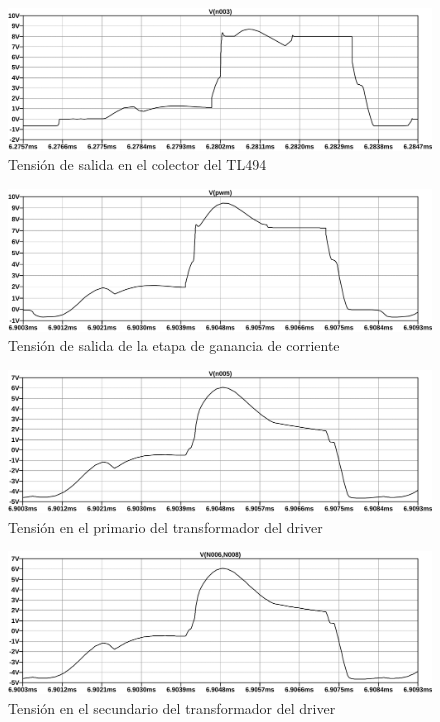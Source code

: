 \begin{figure}[ht]
    \centering
    \includegraphics[width=\textwidth]{images/sim/1.pdf}
    \caption{Tensión de salida en el colector del TL494}
    \label{fig:sim:1}
\end{figure}

\begin{figure}[ht]
    \centering
    \includegraphics[width=\textwidth]{images/sim/3.pdf}
    \caption{Tensión de salida de la etapa de ganancia de corriente}
    \label{fig:sim:3}
\end{figure}

\begin{figure}[ht]
    \centering
    \includegraphics[width=\textwidth]{images/sim/4.pdf}
    \caption{Tensión en el primario del transformador del driver}
    \label{fig:sim:4}
\end{figure}

\begin{figure}[ht]
    \centering
    \includegraphics[width=\textwidth]{images/sim/5.pdf}
    \caption{Tensión en el secundario del transformador del driver}
    \label{fig:sim:5}
\end{figure}

